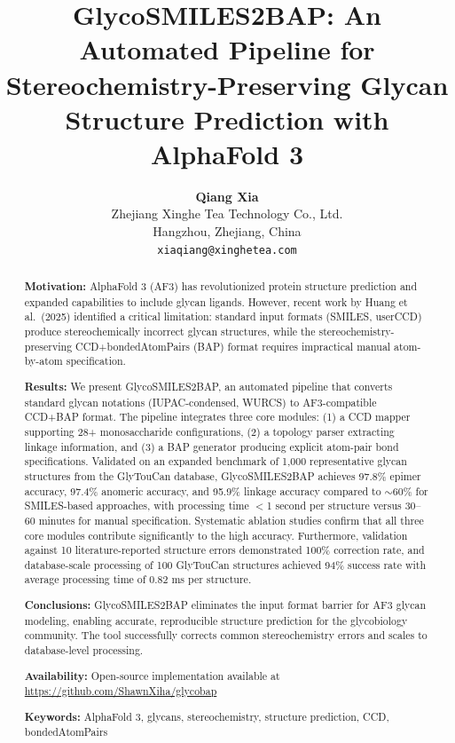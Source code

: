 \documentclass[11pt,a4paper]{article}
\title{\textbf{GlycoSMILES2BAP: An Automated Pipeline for Stereochemistry-Preserving Glycan Structure Prediction with AlphaFold 3}}
\author{
\textbf{Qiang Xia}\\
Zhejiang Xinghe Tea Technology Co., Ltd.\\
Hangzhou, Zhejiang, China\\
\texttt{xiaqiang@xinghetea.com}
}
\date{}
\begin{document}
\maketitle

\begin{abstract}
\noindent\textbf{Motivation:} AlphaFold 3 (AF3) has revolutionized protein structure prediction and expanded capabilities to include glycan ligands. However, recent work by Huang et al.\ (2025) identified a critical limitation: standard input formats (SMILES, userCCD) produce stereochemically incorrect glycan structures, while the stereochemistry-preserving CCD+bondedAtomPairs (BAP) format requires impractical manual atom-by-atom specification.

\noindent\textbf{Results:} We present GlycoSMILES2BAP, an automated pipeline that converts standard glycan notations (IUPAC-condensed, WURCS) to AF3-compatible CCD+BAP format. The pipeline integrates three core modules: (1) a CCD mapper supporting 28+ monosaccharide configurations, (2) a topology parser extracting linkage information, and (3) a BAP generator producing explicit atom-pair bond specifications. Validated on an expanded benchmark of 1,000 representative glycan structures from the GlyTouCan database, GlycoSMILES2BAP achieves 97.8\% epimer accuracy, 97.4\% anomeric accuracy, and 95.9\% linkage accuracy compared to ${\sim}60\%$ for SMILES-based approaches, with processing time $<$1 second per structure versus 30--60 minutes for manual specification. Systematic ablation studies confirm that all three core modules contribute significantly to the high accuracy. Furthermore, validation against 10 literature-reported structure errors demonstrated 100\% correction rate, and database-scale processing of 100 GlyTouCan structures achieved 94\% success rate with average processing time of 0.82 ms per structure.

\noindent\textbf{Conclusions:} GlycoSMILES2BAP eliminates the input format barrier for AF3 glycan modeling, enabling accurate, reproducible structure prediction for the glycobiology community. The tool successfully corrects common stereochemistry errors and scales to database-level processing.

\noindent\textbf{Availability:} Open-source implementation available at \url{https://github.com/ShawnXiha/glycobap}

\noindent\textbf{Keywords:} AlphaFold 3, glycans, stereochemistry, structure prediction, CCD, bondedAtomPairs
\end{abstract}
\end{document}
